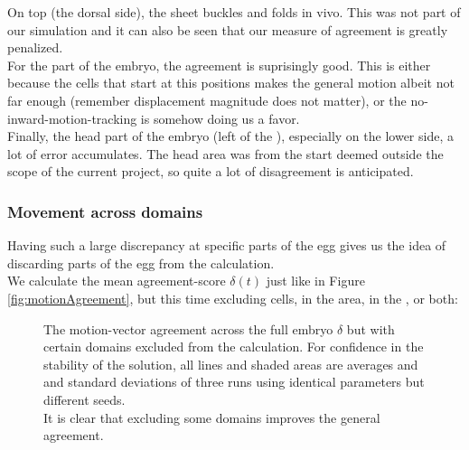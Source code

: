 On top (the dorsal side), the sheet buckles and folds in vivo. This was not part of our simulation and it can also be seen that our measure of agreement is greatly penalized.\\

For the  part of the embryo, the agreement is suprisingly good. This is either because the cells that start at this positions makes the general motion albeit not far enough (remember displacement magnitude does not matter), or the no-inward-motion-tracking is somehow doing us a favor.\\


Finally, the head part of the embryo (left of the ), especially on the lower side, a lot of error accumulates. The head area was from the start deemed outside the scope of the current project, so quite a lot of disagreement is anticipated.\\


\subsubsection{Movement across domains}
Having such a large discrepancy at specific parts of the egg gives us the idea of discarding parts of the egg from the calculation.\\


We calculate the mean agreement-score $\delta(t)$ just like in Figure \ref{fig:motionAgreement}, but this time excluding cells, in the  area, in the , or both:



\begin{figure}[H]
    \centering
    \caption{The motion-vector agreement across the full embryo $\delta$ but with certain domains excluded from the calculation. For confidence in the stability of the solution, all lines and shaded areas are averages and and standard deviations of three runs using identical parameters but different seeds.\\It is clear that excluding some domains improves the general agreement.}
    \label{fig:vector-subsets}
\end{figure}

